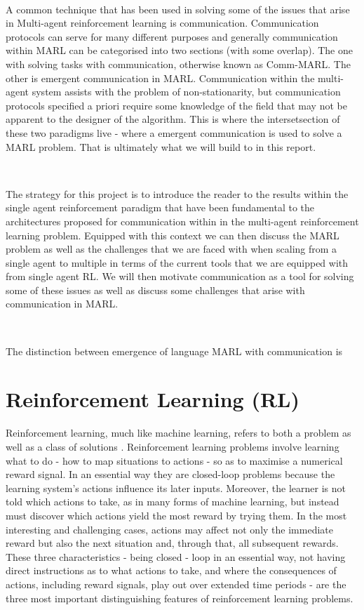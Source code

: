 \documentclass{article}
\begin{document}
\

A common technique that has been used in solving some of the issues that arise in Multi-agent reinforcement learning is communication. Communication protocols can serve for many different purposes and generally communication within MARL can be categorised into two sections (with some overlap). The one with solving tasks with communication, otherwise known as Comm-MARL. The other is emergent communication in MARL. Communication within the multi-agent system assists with the problem of non-stationarity, but communication protocols specified a priori require some knowledge of the field that may not be apparent to the designer of the algorithm. This is where the intersetsection of these two paradigms live - where a emergent communication is used to solve a MARL problem. That is ultimately what we will build to in this report.

\

The strategy for this project is to introduce the reader to the results within the single agent reinforcement paradigm that have been fundamental to the architectures proposed for communication within in the multi-agent reinforcement learning problem. Equipped with this context we can then discuss the MARL problem as well as the challenges that we are faced with when scaling from a single agent to multiple in terms of the current tools that we are equipped with from single agent RL. We will then motivate communication as a tool for solving some of these issues as well as discuss some challenges that arise with communication in MARL.

\

The distinction between emergence of language MARL with communication is 

\section{Reinforcement Learning (RL)}

Reinforcement learning, much like machine learning, refers to both a problem as well as a class of solutions \citep{sutton2018reinforcement}. Reinforcement learning problems involve learning what to do - how to map situations to actions - so as to maximise a numerical reward signal. In an essential way they are closed-loop problems because the learning system’s actions influence its later inputs. Moreover, the learner is not told which actions to take, as in many forms of machine learning, but instead must discover which actions yield the most reward by trying them. In the most interesting and challenging cases, actions may affect not only the immediate reward but also the next situation and, through that, all subsequent rewards. These three characteristics - being closed - loop in an essential way, not having direct instructions as to what actions to take, and where the consequences of actions, including reward signals, play out over extended time periods - are the three most important distinguishing features of reinforcement learning problems.
\end{document}
